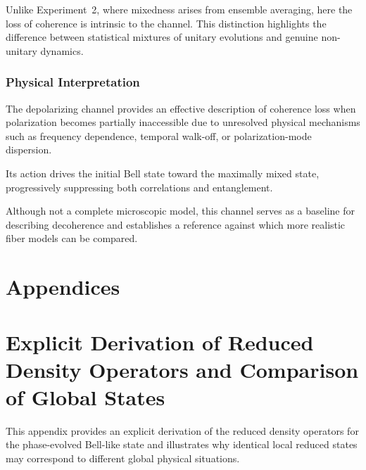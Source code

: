 \documentclass[a4paper]{article}
\begin{document}
Unlike Experiment~2, where mixedness arises from ensemble averaging, here the loss of coherence is intrinsic to the channel. This distinction highlights the difference between statistical mixtures of unitary evolutions and genuine non-unitary dynamics.


\subsubsection{Physical Interpretation}

The depolarizing channel provides an effective description of coherence loss when polarization becomes partially inaccessible due to unresolved physical mechanisms such as frequency dependence, temporal walk-off, or polarization-mode dispersion.

Its action drives the initial Bell state toward the maximally mixed state, progressively suppressing both correlations and entanglement.

Although not a complete microscopic model, this channel serves as a baseline for describing decoherence and establishes a reference against which more realistic fiber models can be compared.



\appendix

\section*{Appendices}


\section{Explicit Derivation of Reduced Density Operators and Comparison of Global States}
\label{app:reduced_density_operators}

This appendix provides an explicit derivation of the reduced density operators for the phase-evolved Bell-like state and illustrates why identical local reduced states may correspond to different global physical situations.
\end{document}
